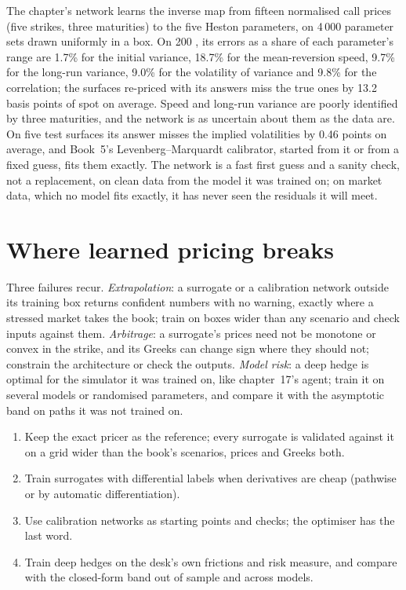 The chapter's network learns the inverse map from fifteen normalised call prices (five strikes, three maturities) to the five
Heston parameters, on 4\,000 parameter sets drawn uniformly in a box. On 200 , its errors as a share of each
parameter's range are 1.7\% for the initial variance, 18.7\% for the mean-reversion speed, 9.7\% for the long-run variance,
9.0\% for the volatility of variance and 9.8\% for the correlation; the surfaces re-priced with its answers miss the true ones
by 13.2 basis points of spot on average. Speed and long-run variance are poorly identified by three maturities, and the network
is as uncertain about them as the data are. On five test surfaces its answer misses the implied volatilities by 0.46 points on
average, and Book~5's Levenberg--Marquardt calibrator, started from it or from a fixed guess, fits them exactly. The network is
a fast first guess and a sanity check, not a replacement, on clean data from the model it was trained on; on market data,
which no model fits exactly, it has never seen the residuals it will meet.

\section{Where learned pricing breaks}

Three failures recur. \emph{Extrapolation}: a surrogate or a calibration network outside its training box returns confident
numbers with no warning, exactly where a stressed market takes the book; train on boxes wider than any scenario and check
inputs against them. \emph{Arbitrage}: a surrogate's prices need not be monotone or convex in the strike, and its Greeks can
change sign where they should not; constrain the architecture or check the outputs. \emph{Model risk}: a deep hedge is optimal
for the simulator it was trained on, like chapter~17's agent; train it on several models or randomised parameters, and compare
it with the asymptotic band on paths it was not trained on.

\begin{method}\label{met:ml:dh:method}
\begin{enumerate}
\item Keep the exact pricer as the reference; every surrogate is validated against it on a grid wider than the book's
scenarios, prices and Greeks both.
\item Train surrogates with differential labels when derivatives are cheap (pathwise or by automatic differentiation).
\item Use calibration networks as starting points and checks; the optimiser has the last word.
\item Train deep hedges on the desk's own frictions and risk measure, and compare with the closed-form band out of sample and
across models.
\end{enumerate}
\end{method}

